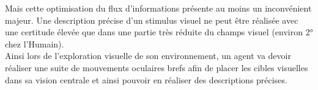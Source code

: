 Mais cette optimisation du flux d'informations présente au moins un inconvénient majeur. Une description précise d'un stimulus visuel ne peut être réalisée avec une certitude élevée que dans une partie très réduite du champs visuel (environ 2° chez l'Humain).\\
Ainsi lors de l'exploration visuelle de son environnement, un agent va devoir réaliser une suite de mouvements oculaires brefs afin de placer les cibles visuelles dans sa vision centrale et ainsi pouvoir en réaliser des descriptions précises.